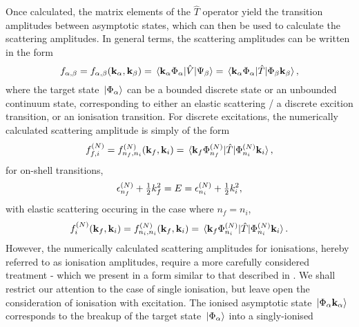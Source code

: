 \documentclass[]{article}
\begin{document}
Once calculated, the matrix elements of the $\hat{T}$ operator yield the
transition amplitudes between asymptotic states, which can then be used to
calculate the scattering amplitudes.
In general terms, the scattering amplitudes can be written in the form
\begin{equation}
  \label{eq:scattering-amplitude}
  f_{\alpha, \beta}
  =
  f_{\alpha, \beta}(\vb{k}_{\alpha}, \vb{k}_{\beta})
  =
  \mel*
  {\vb{k}_{\alpha} \Phi_{\alpha}}
  {\hat{V}}
  {\Psi_{\beta}}
  =
  \mel*
  {\vb{k}_{\alpha} \Phi_{\alpha}}
  {\hat{T}}
  {\Phi_{\beta} \vb{k}_{\beta}}
  ,
\end{equation}
where the target state $\ket*{\Phi_{\alpha}}$ can be a bounded discrete
state or an unbounded continuum state, corresponding to either an elastic
scattering / a discrete excition transition, or an ionisation transition.
For discrete excitations, the numerically calculated scattering amplitude is
simply of the form
\begin{equation}
  \label{eq:scattering-amplitude-discrete}
  f_{f, i}^{(N)}
  =
  f_{n_{f}, n_{i}}^{(N)}(\vb{k}_{f}, \vb{k}_{i})
  =
  \mel*
  {\vb{k}_{f} \Phi_{n_{f}}^{(N)}}
  {\hat{T}}
  {\Phi_{n_{i}}^{(N)} \vb{k}_{i}}
  ,
\end{equation}
for on-shell transitions,
\begin{equation}
  \label{eq:on-shell-energy-discrete}
  \epsilon_{n_{f}}^{(N)}
  +
  \tfrac{1}{2}
  k_{f}^{2}
  =
  E
  =
  \epsilon_{n_{i}}^{(N)}
  +
  \tfrac{1}{2}
  k_{i}^{2}
  ,
\end{equation}
with elastic scattering occuring in the case where $n_{f} = n_{i}$,
\begin{equation}
  \label{eq:scattering-amplitude-elastic}
  f_{i}^{(N)}(\vb{k}_{f}, \vb{k}_{i})
  =
  f_{n_{i}, n_{i}}^{(N)}(\vb{k}_{f}, \vb{k}_{i})
  =
  \mel*
  {\vb{k}_{f} \Phi_{n_{i}}^{(N)}}
  {\hat{T}}
  {\Phi_{n_{i}}^{(N)} \vb{k}_{i}}
  .
\end{equation}
However, the numerically calculated scattering amplitudes for ionisations,
hereby referred to as ionisation amplitudes,
require a more carefully considered treatment - which we present in a form
similar to that described in \cite{PhysRevLett.89.273201, PhysRevA.90.022710}.
We shall restrict our attention to the case of single ionisation, but leave open
the consideration of ionisation with excitation.
The ionised asymptotic state $\ket*{\Phi_{\alpha} \vb{k}_{\alpha}}$ corresponds
to the breakup of the target state $\ket*{\Phi_{\alpha}}$ into a singly-ionised
\end{document}
